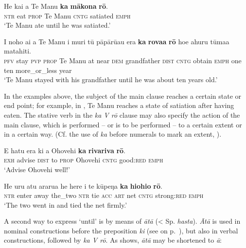 \ea\label{ex:11.237}
\gll He kai a Te Manu \textbf{ka} \textbf{mākona} \textbf{rō}. \\
\textsc{ntr} eat \textsc{prop} Te Manu \textsc{cntg} satiated \textsc{emph} \\

\glt 
‘Te Manu ate until he was satiated.’ \textstyleExampleref{[R245.067]} 
\z

\ea\label{ex:11.238}
\gll I noho ai a Te Manu {\ꞌ}i muri tū pāpārū{\ꞌ}au era \textbf{ka} \textbf{rova{\ꞌ}a} \textbf{rō}  ho{\ꞌ}e {\ꞌ}ahuru tūma{\ꞌ}a matahiti.\\
\textsc{pfv} stay \textsc{pvp} \textsc{prop} Te Manu at near \textsc{dem} grandfather \textsc{dist} \textsc{cntg} obtain \textsc{emph}  one ten more\_or\_less year\\

\glt
‘Te Manu stayed with his grandfather until he was about ten years old.’ \textstyleExampleref{[R245.159]} 
\z

In the examples above, the subject of the main clause reaches a certain state or end point; for example, in , Te Manu reaches a state of satiation after having eaten. The stative verb in the \textit{ka V rō} clause may also specify the action of the main clause, which is performed – or is to be performed – to a certain extent or in a certain way. (Cf. the use of \textit{ka} before numerals to mark an extent, ).

\ea\label{ex:11.239}
\gll E hatu era ki a {\ꞌ}Ohovehi \textbf{ka} \textbf{rivariva} \textbf{rō}. \\
\textsc{exh} advise \textsc{dist} to \textsc{prop} Ohovehi \textsc{cntg} good:\textsc{red} \textsc{emph} \\

\glt 
‘Advise Ohovehi well!’ \textstyleExampleref{[R310.277]} 
\z

\ea\label{ex:11.240}
\gll He uru atu ararua he here i te kūpeŋa \textbf{ka} \textbf{hiohio} \textbf{rō}. \\
\textsc{ntr} enter away the\_two \textsc{ntr} tie \textsc{acc} \textsc{art} net \textsc{cntg} strong:\textsc{red} \textsc{emph} \\

\glt 
‘The two went in and tied the net firmly.’ \textstyleExampleref{[R310.397]}\textstyleExampleref{} 
\z

A second way to express ‘until’ is by means of \textit{{\ꞌ}ātā} ({\textless} Sp. \textit{hasta}). \textit{{\ꞌ}Ātā} is used in nominal constructions before the preposition \textit{ki} (see  on p.~\pageref{ex:4.267}), but also in verbal constructions, followed by \textit{ka V rō}. As  shows, \textit{{\ꞌ}ātā} may be shortened to \textit{{\ꞌ}ā}:

